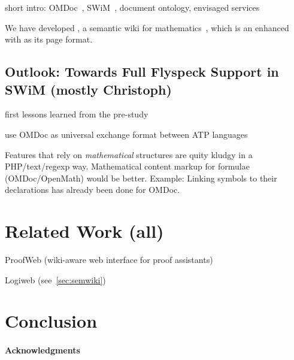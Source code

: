 \documentclass{llncs}
\begin{document}
short intro: OMDoc~\cite{Kohlhase:omdoc1.2}, SWiM~\cite{Lange:swmkm-tr07}, document
ontology, envisaged services

We have developed {\swim}, a semantic wiki for mathematics~\cite{Lange:swmkm-tr07}, which
is an enhanced ~\cite{KrSchVr:semwiki-reasoning07} with {\omdoc} as its
page format.

\subsection{Outlook: Towards Full Flyspeck Support in SWiM (mostly Christoph)}
\label{sec:flyspeck-swim}

first lessons learned from the pre-study

use OMDoc as universal exchange format between ATP languages

Features that rely on \emph{mathematical} structures are quity kludgy in a PHP/text/regexp
way.  Mathematical content markup for formulae (OMDoc/OpenMath) would be better.  Example:
Linking symbols to their declarations has already been done for OMDoc.


\section{Related Work (all)}
\label{sec:related}


ProofWeb (wiki-aware web interface for proof
assistants)~\cite{CorKal:CoopReposFormalProofs07}

Logiweb (see~\ref{sec:semwiki})

\section{Conclusion}
\label{sec:conc}


\paragraph{Acknowledgments}
\label{sec:ack}





\ednotemessage
\end{document}
